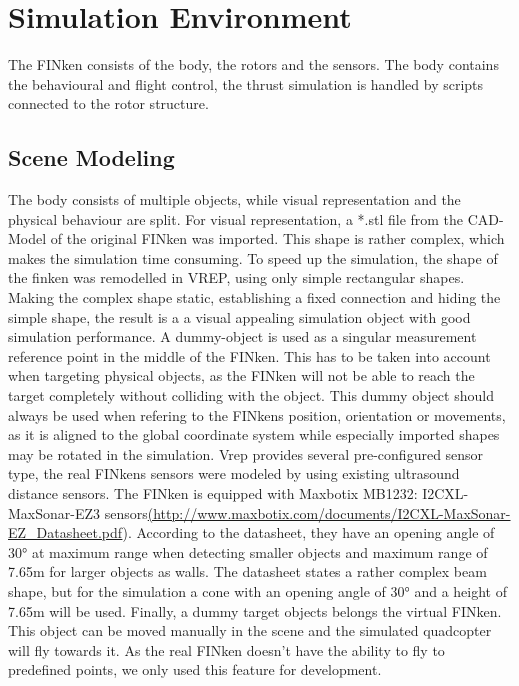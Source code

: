 \label{sec:implementation}

\section{Simulation Environment}

The FINken consists of the body, the rotors and the sensors. The body contains the behavioural and flight control, the thrust simulation is handled by scripts connected to the rotor structure.

\subsection{Scene Modeling}

The body consists of multiple objects, while visual representation and the physical behaviour are split. For visual representation, a *.stl file from the CAD-Model of the original FINken was imported. This shape is rather complex, which makes the simulation time consuming. To speed up the simulation, the shape of the finken was remodelled in VREP, using only simple rectangular shapes. Making the complex shape static, establishing a fixed connection and hiding the simple shape, the result is a a visual appealing simulation object with good simulation performance. A dummy-object is used as a singular measurement reference point in the middle of the FINken. This has to be taken into account when targeting physical objects, as the FINken will not be able to reach the target completely without colliding with the object. This dummy object should always be used when refering to the FINkens position, orientation or movements, as it is aligned to the global coordinate system while especially imported shapes may be rotated in the simulation. Vrep provides several pre-configured sensor type, the real FINkens sensors were modeled by using existing ultrasound distance sensors. The FINken is equipped with Maxbotix MB1232: I2CXL-MaxSonar-EZ3 sensors\url{(http://www.maxbotix.com/documents/I2CXL-MaxSonar-EZ_Datasheet.pdf}). According to the datasheet, they have an opening angle of $\ang{30}$ at maximum range when detecting smaller objects and maximum range of 7.65m for larger objects as walls. The datasheet states a rather complex beam shape, but for the simulation a cone with an opening angle of $\ang{30}$  and a height of 7.65m will be used. Finally, a dummy target objects belongs the virtual FINken. This object can be moved manually in the scene and the simulated quadcopter will fly towards it.  As the real FINken doesn't have the ability to fly to predefined points, we only used this feature for development.


